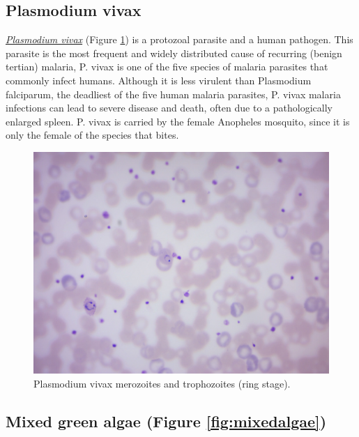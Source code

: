 \subsection{Plasmodium vivax}\label{plasmodium-vivax}

\href{https://en.wikipedia.org/wiki/Plasmodium_vivax}{\emph{Plasmodium
vivax}} (Figure \ref{fig:plasmodium}) is a protozoal parasite and a
human pathogen. This parasite is the most frequent and widely
distributed cause of recurring (benign tertian) malaria, P. vivax is one
of the five species of malaria parasites that commonly infect humans.
Although it is less virulent than Plasmodium falciparum, the deadliest
of the five human malaria parasites, P. vivax malaria infections can
lead to severe disease and death, often due to a pathologically enlarged
spleen. P. vivax is carried by the female Anopheles mosquito, since it
is only the female of the species that bites.

\begin{figure}

{\centering \includegraphics[width=0.7\linewidth]{./figures/protists/Plasmodium_vivax} 

}

\caption{Plasmodium vivax merozoites and trophozoites (ring stage).}\label{fig:plasmodium}
\end{figure}

\subsection{Mixed green algae (Figure
\ref{fig:mixedalgae})}\label{mixed-green-algae-figure-reffigmixedalgae}

